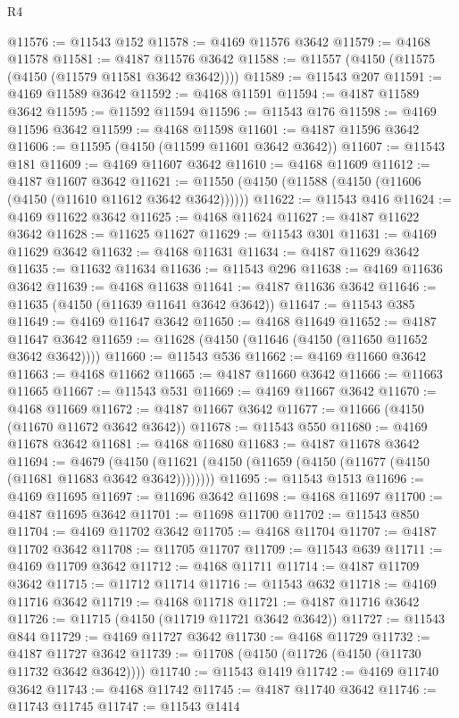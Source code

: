 \begin{lexlean}{R4}
\begin{coremodule}
@11576 := @11543 @152
@11578 := @4169 @11576 @3642
@11579 := @4168 @11578
@11581 := @4187 @11576 @3642
@11588 := @11557 (@4150 (@11575 (@4150 (@11579 @11581 @3642 @3642))))
@11589 := @11543 @207
@11591 := @4169 @11589 @3642
@11592 := @4168 @11591
@11594 := @4187 @11589 @3642
@11595 := @11592 @11594
@11596 := @11543 @176
@11598 := @4169 @11596 @3642
@11599 := @4168 @11598
@11601 := @4187 @11596 @3642
@11606 := @11595 (@4150 (@11599 @11601 @3642 @3642))
@11607 := @11543 @181
@11609 := @4169 @11607 @3642
@11610 := @4168 @11609
@11612 := @4187 @11607 @3642
@11621 := @11550 (@4150 (@11588 (@4150 (@11606 (@4150 (@11610 @11612 @3642 @3642))))))
@11622 := @11543 @416
@11624 := @4169 @11622 @3642
@11625 := @4168 @11624
@11627 := @4187 @11622 @3642
@11628 := @11625 @11627
@11629 := @11543 @301
@11631 := @4169 @11629 @3642
@11632 := @4168 @11631
@11634 := @4187 @11629 @3642
@11635 := @11632 @11634
@11636 := @11543 @296
@11638 := @4169 @11636 @3642
@11639 := @4168 @11638
@11641 := @4187 @11636 @3642
@11646 := @11635 (@4150 (@11639 @11641 @3642 @3642))
@11647 := @11543 @385
@11649 := @4169 @11647 @3642
@11650 := @4168 @11649
@11652 := @4187 @11647 @3642
@11659 := @11628 (@4150 (@11646 (@4150 (@11650 @11652 @3642 @3642))))
@11660 := @11543 @536
@11662 := @4169 @11660 @3642
@11663 := @4168 @11662
@11665 := @4187 @11660 @3642
@11666 := @11663 @11665
@11667 := @11543 @531
@11669 := @4169 @11667 @3642
@11670 := @4168 @11669
@11672 := @4187 @11667 @3642
@11677 := @11666 (@4150 (@11670 @11672 @3642 @3642))
@11678 := @11543 @550
@11680 := @4169 @11678 @3642
@11681 := @4168 @11680
@11683 := @4187 @11678 @3642
@11694 := @4679
    (@4150 (@11621 (@4150 (@11659 (@4150 (@11677 (@4150 (@11681 @11683 @3642 @3642))))))))
@11695 := @11543 @1513
@11696 := @4169 @11695
@11697 := @11696 @3642
@11698 := @4168 @11697
@11700 := @4187 @11695 @3642
@11701 := @11698 @11700
@11702 := @11543 @850
@11704 := @4169 @11702 @3642
@11705 := @4168 @11704
@11707 := @4187 @11702 @3642
@11708 := @11705 @11707
@11709 := @11543 @639
@11711 := @4169 @11709 @3642
@11712 := @4168 @11711
@11714 := @4187 @11709 @3642
@11715 := @11712 @11714
@11716 := @11543 @632
@11718 := @4169 @11716 @3642
@11719 := @4168 @11718
@11721 := @4187 @11716 @3642
@11726 := @11715 (@4150 (@11719 @11721 @3642 @3642))
@11727 := @11543 @844
@11729 := @4169 @11727 @3642
@11730 := @4168 @11729
@11732 := @4187 @11727 @3642
@11739 := @11708 (@4150 (@11726 (@4150 (@11730 @11732 @3642 @3642))))
@11740 := @11543 @1419
@11742 := @4169 @11740 @3642
@11743 := @4168 @11742
@11745 := @4187 @11740 @3642
@11746 := @11743 @11745
@11747 := @11543 @1414

\end{coremodule}
\end{lexlean}
